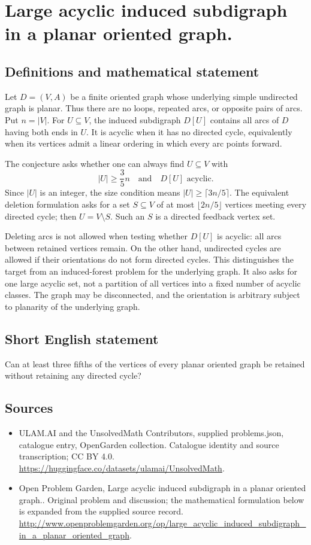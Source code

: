 \documentclass[11pt,a4paper]{article}
\begin{document}
\section*{Large acyclic induced subdigraph in a planar oriented graph.}\label{statement}

\subsection{Definitions and mathematical statement}
Let $D=(V,A)$ be a finite oriented graph whose underlying simple
undirected graph is planar. Thus there are no loops, repeated arcs,
or opposite pairs of arcs. Put $n=|V|$. For $U\subseteq V$, the induced
subdigraph $D[U]$ contains all arcs of $D$ having both ends in $U$.
It is acyclic when it has no directed cycle, equivalently when its
vertices admit a linear ordering in which every arc points forward.

The conjecture asks whether one can always find $U\subseteq V$ with
\[
                           |U|\ge\frac35n
                  \quad\text{and}\quad D[U]\text{ acyclic}.
\]
Since $|U|$ is an integer, the size condition means
$|U|\ge\lceil3n/5\rceil$. The equivalent deletion formulation asks for
a set $S\subseteq V$ of at most $\lfloor2n/5\rfloor$ vertices meeting
every directed cycle; then $U=V\setminus S$. Such an $S$ is a directed
feedback vertex set.

Deleting arcs is not allowed when testing whether $D[U]$ is acyclic:
all arcs between retained vertices remain. On the other hand,
undirected cycles are allowed if their orientations do not form
directed cycles. This distinguishes the target from an induced-forest
problem for the underlying graph. It also asks for one large acyclic
set, not a partition of all vertices into a fixed number of acyclic
classes. The graph may be disconnected, and the orientation is arbitrary
subject to planarity of the underlying graph.
\subsection{Short English statement}
Can at least three fifths of the vertices of every planar oriented graph be retained without retaining any directed cycle?
\subsection{Sources}
\begin{itemize}
\item[S1] ULAM.AI and the UnsolvedMath Contributors, supplied problems.json, catalogue entry, OpenGarden collection. Catalogue identity and source transcription; CC BY 4.0.
\url{https://huggingface.co/datasets/ulamai/UnsolvedMath}.
\item[S2] Open Problem Garden, Large acyclic induced subdigraph in a planar oriented graph.. Original problem and discussion; the mathematical formulation below is expanded from the supplied source record.
\url{http://www.openproblemgarden.org/op/large_acyclic_induced_subdigraph_in_a_planar_oriented_graph}.
\end{itemize}
\end{document}
